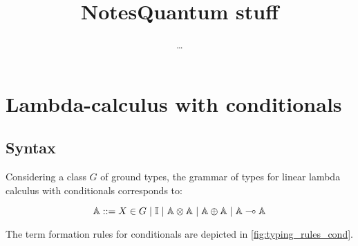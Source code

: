 \documentclass[10pt,a4paper]{amsart}
\author{\dots}
\title{Notes}
\theoremstyle{definition}
\theoremstyle{definition}
\theoremstyle{definition}
\theoremstyle{definition}
\theoremstyle{definition}
\theoremstyle{definition}
\begin{document}
\title{Quantum stuff}
\maketitle
\section{Lambda-calculus with conditionals}

\subsection{Syntax}

Considering a class $G$ of ground types, the grammar of types for linear lambda calculus with conditionals corresponds to:

\begin{equation*} \label{eq:grammartypes}
  \centering
   \typeA ::= X \in G \hspace{3 pt} \vert \hspace{3 pt} \typeI \hspace{3 pt}  \vert \hspace{3 pt} \typeA  \otimes  \typeA \hspace{3 pt} \vert  \hspace{3 pt} \typeA  \oplus \typeA \hspace{3 pt}  \vert  \hspace{3 pt} \typeA \multimap  \typeA
  \end{equation*}

The term formation rules for conditionals are depicted in \autoref{fig:typing_rules_cond}. 
\end{document}
